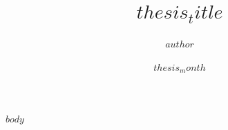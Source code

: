 \documentclass[12pt]{article}
\title{$thesis_title$}
\author{$author$}
\date{$thesis_month$}{$thesis_year$}
\begin{document}
\createtitlepage
\createsignaturepage

\createcopyrightpage

\begin{aknowledgements}
\normalsize

\end{aknowledgements}

\begin{abstract}
\normalsize

\end{abstract}

\tableofcontents 

\listoftables

\listoffigures

\begin{thesis}

$body$

\end{thesis}
\end{document}
